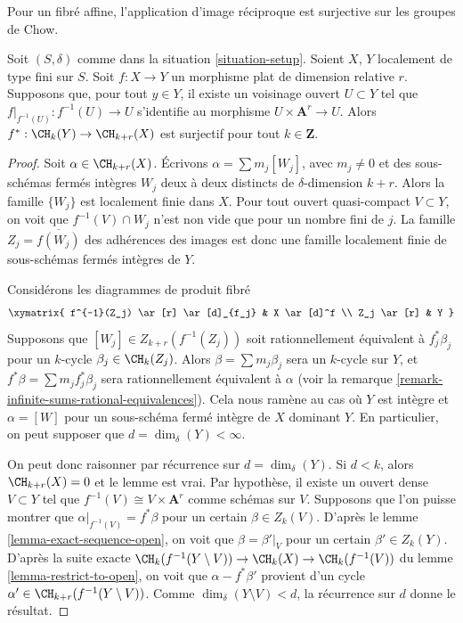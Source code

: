 \noindent
Pour un fibré affine, l'application d'image réciproque est surjective sur les groupes de Chow.

\begin{lemma}
\label{lemma-pullback-affine-fibres-surjective}
Soit $(S, \delta)$ comme dans la situation \ref{situation-setup}.
Soient $X$, $Y$ localement de type fini sur $S$.
Soit $f : X \to Y$ un morphisme plat de dimension relative $r$.
Supposons que, pour tout $y \in Y$, il existe un voisinage ouvert
$U \subset Y$ tel que $f|_{f^{-1}(U)} : f^{-1}(U) \to U$
s'identifie au morphisme $U \times \mathbf{A}^r \to U$.
Alors $f^* : \CH_k(Y) \to \CH_{k + r}(X)$ est surjectif pour tout
$k \in \mathbf{Z}$.
\end{lemma}

\begin{proof}
Soit $\alpha \in \CH_{k + r}(X)$.
Écrivons $\alpha = \sum m_j[W_j]$, avec $m_j \not = 0$ et
des sous-schémas fermés intègres $W_j$ deux à deux distincts de
$\delta$-dimension $k + r$. Alors la famille $\{W_j\}$
est localement finie dans $X$. Pour tout ouvert quasi-compact
$V \subset Y$, on voit que $f^{-1}(V) \cap W_j$
n'est non vide que pour un nombre fini de $j$. La
famille $Z_j = \overline{f(W_j)}$ des adhérences
des images est donc une famille localement finie de sous-schémas
fermés intègres de $Y$.

\medskip\noindent
Considérons les diagrammes de produit fibré
$$
\xymatrix{
f^{-1}(Z_j) \ar[r] \ar[d]_{f_j} & X \ar[d]^f \\
Z_j \ar[r] & Y
}
$$
Supposons que $[W_j] \in Z_{k + r}(f^{-1}(Z_j))$
soit rationnellement équivalent à $f_j^*\beta_j$ pour un
$k$-cycle $\beta_j \in \CH_k(Z_j)$. Alors
$\beta = \sum m_j \beta_j$ sera un $k$-cycle sur $Y$,
et $f^*\beta = \sum m_j f_j^*\beta_j$ sera rationnellement
équivalent à $\alpha$ (voir la
remarque \ref{remark-infinite-sums-rational-equivalences}).
Cela nous ramène au cas où $Y$ est intègre et
$\alpha = [W]$ pour un sous-schéma fermé intègre
de $X$ dominant $Y$. En particulier, on peut
supposer que $d = \dim_\delta(Y) < \infty$.

\medskip\noindent
On peut donc raisonner par récurrence sur $d = \dim_\delta(Y)$.
Si $d < k$, alors $\CH_{k + r}(X) = 0$ et le lemme est vrai.
Par hypothèse, il existe un ouvert dense $V \subset Y$ tel
que $f^{-1}(V) \cong V \times \mathbf{A}^r$ comme schémas sur $V$.
Supposons que l'on puisse montrer que $\alpha|_{f^{-1}(V)} = f^*\beta$
pour un certain $\beta \in Z_k(V)$. D'après le lemme \ref{lemma-exact-sequence-open},
on voit que
$\beta = \beta'|_V$ pour un certain $\beta' \in Z_k(Y)$.
D'après la suite exacte
$\CH_k(f^{-1}(Y \setminus V)) \to \CH_k(X) \to \CH_k(f^{-1}(V))$
du lemme \ref{lemma-restrict-to-open},
on voit que $\alpha - f^*\beta'$ provient
d'un cycle $\alpha' \in \CH_{k + r}(f^{-1}(Y \setminus V))$.
Comme $\dim_\delta(Y \setminus V) < d$, la récurrence sur
$d$ donne le résultat.


\end{proof}
